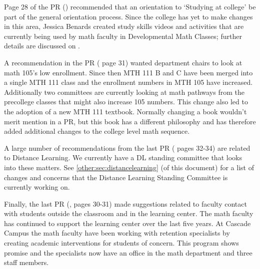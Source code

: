 Page 28 of the PR (\cite{mathprogramreview2003}) recommended that an orientation to `Studying at college'
be part of the general orientation process.  Since the college has yet to make
changes in this area, Jessica Benards created study skills videos and activities
that are currently being used by math faculty in Developmental Math Classes;
further details are discussed on .

A recommendation in the PR (\cite{mathprogramreview2003} page 31) wanted department chairs to look at math
105's low enrollment. Since then MTH 111 B and C have been merged into a single
MTH 111 class and the enrollment numbers in MTH 105 have increased.  Additionally two committees are
currently looking at math pathways from the precollege classes that might also
increase 105 numbers.  This change also led to the adoption of a new MTH 111
textbook.  Normally changing a book wouldn't merit mention in a PR, but this book
has a different philosophy and has therefore added additional changes to the
college level math sequence.

A large number of recommendations from the last PR (\cite{mathprogramreview2003} pages 32-34) are related to
Distance Learning. We currently have a DL standing committee that looks into
these matters.  See \vref{other:sec:distancelearning} (of this document) for a list of changes and concerns
that the Distance Learning Standing Committee is currently working on.

Finally, the last PR (\cite{mathprogramreview2003}, pages 30-31) made suggestions related to faculty contact with
students outside the classroom and in the learning center.  The math faculty has
continued to support the learning center over the last five years.  At Cascade
Campus the math faculty have been working with retention specialists by creating
academic interventions for students of concern.  This program shows promise and
the specialists now have an office in the math department and three staff members.

